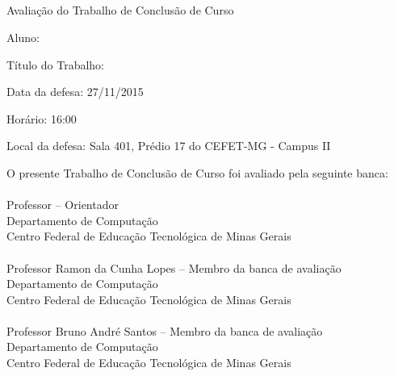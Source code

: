\begin{center}
\textbf{\imprimirinstituicao}\\~\\
\imprimirprograma\\~\\
Avaliação do Trabalho de Conclusão de Curso
\end{center}

\hfill \break
\hfill \break
\noindent Aluno: \imprimirautor

\noindent Título do Trabalho: \imprimirtitulo

\noindent Data da defesa: 27/11/2015

\noindent Horário: 16:00

\noindent Local da defesa: Sala 401, Prédio 17 do CEFET-MG - Campus II
\hfill \break
\newline
\begin{center}
O  presente Trabalho de Conclusão de Curso foi avaliado pela seguinte banca:\\~\\

Professor \imprimirorientador  -- Orientador\\
Departamento de Computação \\
Centro Federal de Educação Tecnológica de Minas Gerais\\~\\

Professor Ramon da Cunha Lopes -- Membro da banca de avaliação \\
Departamento de Computação \\
Centro Federal de Educação Tecnológica de Minas Gerais \\~\\

Professor Bruno André Santos -- Membro da banca de avaliação \\
Departamento de Computação \\
Centro Federal de Educação Tecnológica de Minas Gerais \\~\\

\end{center}
